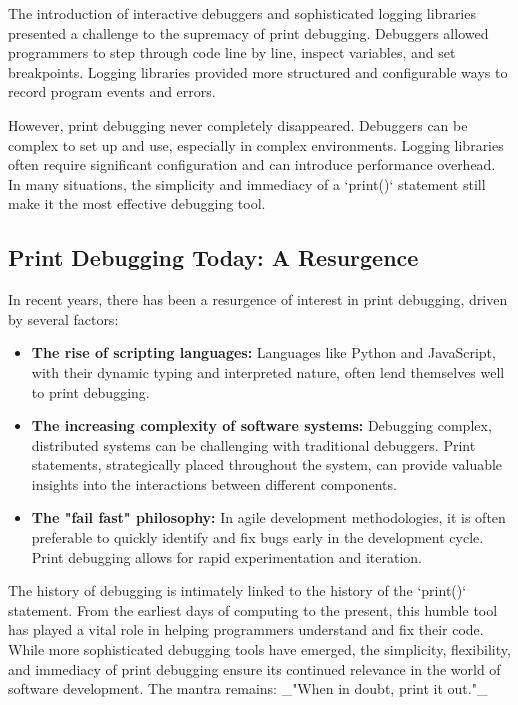\documentclass{article}
\begin{document}
The introduction of interactive debuggers and sophisticated logging libraries presented a challenge to the supremacy of print debugging. Debuggers allowed programmers to step through code line by line, inspect variables, and set breakpoints. Logging libraries provided more structured and configurable ways to record program events and errors.

However, print debugging never completely disappeared. Debuggers can be complex to set up and use, especially in complex environments. Logging libraries often require significant configuration and can introduce performance overhead. In many situations, the simplicity and immediacy of a `print()` statement still make it the most effective debugging tool.

\subsection*{Print Debugging Today: A Resurgence}

In recent years, there has been a resurgence of interest in print debugging, driven by several factors:

\begin{itemize}
    \item \textbf{The rise of scripting languages:} Languages like Python and JavaScript, with their dynamic typing and interpreted nature, often lend themselves well to print debugging.
    \item \textbf{The increasing complexity of software systems:} Debugging complex, distributed systems can be challenging with traditional debuggers. Print statements, strategically placed throughout the system, can provide valuable insights into the interactions between different components.
    \item \textbf{The "fail fast" philosophy:} In agile development methodologies, it is often preferable to quickly identify and fix bugs early in the development cycle. Print debugging allows for rapid experimentation and iteration.
\end{itemize}

The history of debugging is intimately linked to the history of the `print()` statement. From the earliest days of computing to the present, this humble tool has played a vital role in helping programmers understand and fix their code. While more sophisticated debugging tools have emerged, the simplicity, flexibility, and immediacy of print debugging ensure its continued relevance in the world of software development. The mantra remains: _"When in doubt, print it out."_
\end{document}
